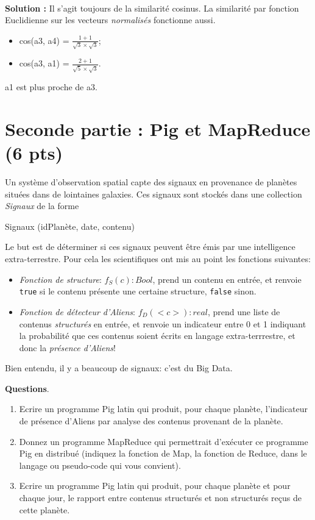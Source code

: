 \documentclass[11pt,a4paper]{article}
\newenvironment{solution}[0]{
~\\ \color{red} \textbf{Solution :}\color{black}}{%
}
\begin{document}
\begin{enumerate}
\begin{solution}
Il s'agit toujours de la similarité cosinus. La similarité par fonction Euclidienne
sur les vecteurs \emph{normalisés} fonctionne aussi.

\begin{itemize}
  \item cos(a3, a4) = $\frac{1 +  1}{\sqrt{3} \times \sqrt{3}}$;
  \item cos(a3, a1) = $\frac{2 +  1}{\sqrt{5} \times \sqrt{3}}$.
\end{itemize}
a1 est plus proche de a3. 

\end{solution}
  \end{enumerate}

\section*{Seconde partie : Pig et MapReduce (6 pts)}

Un système d'observation spatial capte des signaux en provenance de planètes
situées dans de lointaines galaxies.  Ces signaux sont stockés dans une collection \textit{Signaux} de la forme

\begin{center}
  Signaux (idPlanète, date, contenu)
\end{center}

Le but est de déterminer si ces signaux peuvent être émis par une intelligence extra-terrestre.
Pour cela les scientifiques ont mis au point les fonctions suivantes:

  \begin{itemize}
     \item \emph{Fonction de structure}: $f_S(c): Bool$, prend un contenu en entrée, et renvoie \texttt{true}
        si le contenu présente une certaine structure, \texttt{false} sinon.
     \item \emph{Fonction de détecteur d'Aliens}: $f_D(<c>): real$, prend une liste de contenus \emph{structurés} en entrée, et renvoie 
        un indicateur entre 0 et 1 indiquant la probabilité que ces contenus soient écrits en  langage extra-terrrestre,
        et donc la \emph{présence d'Aliens}!
  \end{itemize}
  
Bien entendu, il y a beaucoup de signaux: c'est du Big Data.

\medskip
\textbf{Questions}.

\begin{enumerate}
  \item Ecrire un programme Pig latin qui produit, pour chaque planète, l'indicateur de présence d'Aliens
     par analyse des contenus provenant de la planète.
  \item Donnez un programme MapReduce qui permettrait d'exécuter ce programme Pig en distribué
      (indiquez la fonction de Map, la fonction de Reduce, dans le langage ou pseudo-code qui vous convient).
  \item Ecrire un programme Pig latin qui produit, pour chaque planète et pour chaque jour, 
     le rapport entre  contenus structurés et non structurés reçus de cette planète. 
\end{enumerate}
\end{document}
